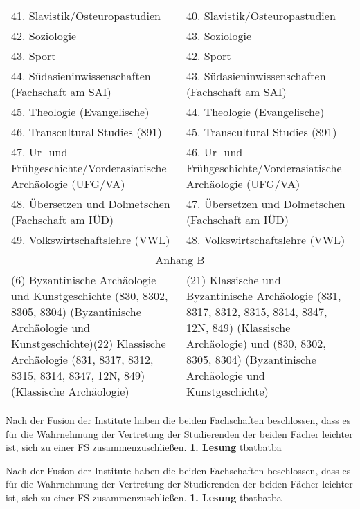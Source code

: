 {\begin{longtable}{|p{7.5cm}|p{7.5cm}|}
        41. Slavistik/Osteuropastudien                                   & 40. Slavistik/Osteuropastudien                                   \\
        42. Soziologie                                                   & 43. Soziologie                                                   \\
        43. Sport                                                        & 42. Sport                                                        \\
        44. Südasieninwissenschaften (Fachschaft am SAI)                 & 43. Südasieninwissenschaften (Fachschaft am SAI)                 \\
        45. Theologie (Evangelische)                                     & 44. Theologie (Evangelische)                                     \\
        46. Transcultural Studies (891)                                  & 45. Transcultural Studies (891)                                  \\
        47. Ur- und Frühgeschichte/Vorderasiatische Archäologie (UFG/VA) & 46. Ur- und Frühgeschichte/Vorderasiatische Archäologie (UFG/VA) \\
        48. Übersetzen und Dolmetschen (Fachschaft am IÜD)               & 47. Übersetzen und Dolmetschen (Fachschaft am IÜD)               \\
        49. Volkswirtschaftslehre (VWL)                                  & 48. Volkswirtschaftslehre (VWL)                                  \\
        \multicolumn{2}{|c|}{Anhang B}\\\hline
        (6) Byzantinische Archäologie und Kunstgeschichte (830, 8302, 8305, 8304)
 (Byzantinische Archäologie und Kunstgeschichte)\newline (22) Klassische Archäologie (831, 8317, 8312, 8315, 8314, 8347, 12N, 849) (Klassische
 Archäologie) & (21) Klassische und Byzantinische Archäologie (831, 8317, 8312, 8315, 8314, 8347,
 12N, 849) (Klassische Archäologie) und (830, 8302, 8305, 8304) (Byzantinische
 Archäologie und Kunstgeschichte)\\
    \end{longtable}
}{
    Nach der Fusion der Institute haben die beiden Fachschaften beschlossen, dass es für die Wahrnehmung der Vertretung der Studierenden der beiden Fächer leichter ist, sich zu einer FS zusammenzuschließen.
}{
    \textbf{1. Lesung}
    \ul{}
}{tba}{tba}{tba}

{
    
}{
    Nach der Fusion der Institute haben die beiden Fachschaften beschlossen, dass es für die Wahrnehmung der Vertretung der Studierenden der beiden Fächer leichter ist, sich zu einer FS zusammenzuschließen.
}{
    \textbf{1. Lesung}
    \ul{}
}{tba}{tba}{tba}